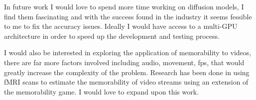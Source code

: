 \documentclass{UoYCSproject}
\begin{document}
In future work I would love to spend more time working on diffusion models, I find them fascinating and with the success found in the industry \cite{ramesh2022hierarchical, saharia2022photorealistic} it seems fessible to me to fix the accuracy issues. Ideally I would have access to a multi-GPU architecture in order to speed up the development and testing process.

I would also be interested in exploring the application of memorability to videos, there are far more factors involved including audio, movement, fps, that would greatly increase the complexity of the problem. Research has been done in \cite{HASSON2004, HASSONNeurocinematics, HASSON2008, fMRIPredictions} using fMRI scans to estimate the memorability of video streams using an extension of the memorability game. I would love to expand upon this work.





\end{document}
